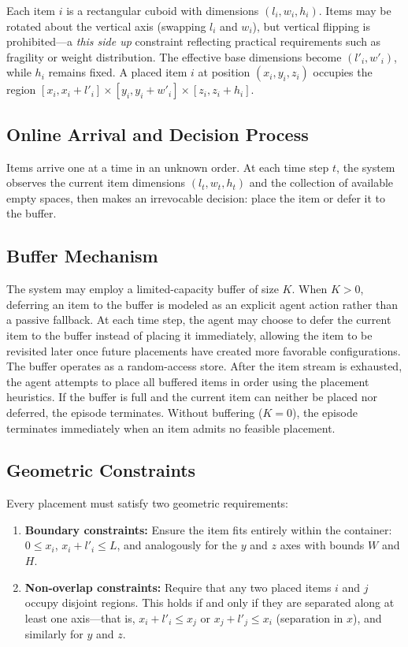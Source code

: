 \documentclass[runningheads]{llncs}
\begin{document}
Each item $i$ is a rectangular cuboid with dimensions $(l_i, w_i, h_i)$. Items may be rotated about the vertical axis (swapping $l_i$ and $w_i$), but vertical flipping is prohibited—a \emph{this side up} constraint reflecting practical requirements such as fragility or weight distribution. The effective base dimensions become $(l'_i, w'_i)$, while $h_i$ remains fixed. A placed item $i$ at position $(x_i, y_i, z_i)$ occupies the region $[x_i, x_i + l'_i] \times [y_i, y_i + w'_i] \times [z_i, z_i + h_i]$.

\subsection{Online Arrival and Decision Process}
Items arrive one at a time in an unknown order. At each time step $t$, the system observes the current item dimensions $(l_t, w_t, h_t)$ and the collection of available empty spaces, then makes an irrevocable decision: place the item or defer it to the buffer.

\subsection{Buffer Mechanism}
The system may employ a limited-capacity buffer of size $K$. When $K > 0$, deferring an item to the buffer is modeled as an explicit agent action rather than a passive fallback. At each time step, the agent may choose to defer the current item to the buffer instead of placing it immediately, allowing the item to be revisited later once future placements have created more favorable configurations. The buffer operates as a random-access store. After the item stream is exhausted, the agent attempts to place all buffered items in order using the placement heuristics. If the buffer is full and the current item can neither be placed nor deferred, the episode terminates. Without buffering ($K = 0$), the episode terminates immediately when an item admits no feasible placement.

\subsection{Geometric Constraints}
Every placement must satisfy two geometric requirements:
\begin{enumerate}
    \item \textbf{Boundary constraints:} Ensure the item fits entirely within the container: $0 \leq x_i$, $x_i + l'_i \leq L$, and analogously for the $y$ and $z$ axes with bounds $W$ and $H$.
    \item \textbf{Non-overlap constraints:} Require that any two placed items $i$ and $j$ occupy disjoint regions. This holds if and only if they are separated along at least one axis—that is, $x_i + l'_i \leq x_j$ or $x_j + l'_j \leq x_i$ (separation in $x$), and similarly for $y$ and $z$.
\end{enumerate}
\end{document}
